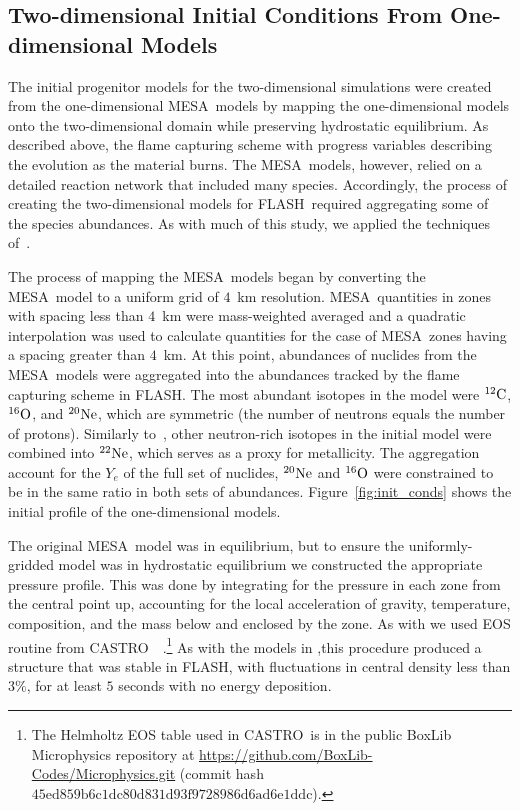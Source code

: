 \documentclass[iop,apj]{emulateapj}
\newcommand{\figref}[1]{Figure~\ref{#1}}
\newcommand{\C}[1]{\ensuremath{{}^{#1}{\rm C}}}
\newcommand{\Ox}[1]{\ensuremath{{}^{#1}{\rm O}}}
\newcommand{\Ne}[1]{\ensuremath{{}^{#1}{\rm Ne}}}
\newcommand{\code}[1]{\textsc{#1}}
\newcommand{\FLASH}{\code{FLASH}}
\newcommand{\CASTRO}{\code{CASTRO}}
\newcommand{\MESA}{\code{MESA}}
\begin{document}
\subsection{Two-dimensional Initial Conditions From One-dimensional Models}

The initial progenitor models for the two-dimensional simulations were
created from the one-dimensional \MESA\ models by mapping the one-dimensional
models onto the two-dimensional domain while 
preserving hydrostatic equilibrium.
As described above, the flame capturing scheme with progress
variables describing the evolution as the material burns. The \MESA\
models, however, relied on a detailed reaction network that included
many species. Accordingly, the process of creating the two-dimensional
models for \FLASH\ required aggregating some of the species abundances.
As with much of this study, we applied the 
techniques of~\citet{willcoxetal2016}.


The process of mapping the \MESA\ models began by converting 
the \MESA\ model to a uniform grid of $4$~km resolution. \MESA\ 
quantities in zones with spacing less than $4$~km 
were mass-weighted averaged and a quadratic interpolation
was used to calculate quantities for the case of \MESA\ zones having
a spacing greater than $4$~km. At this point, 
abundances of nuclides from the \MESA\ models were aggregated
into the abundances tracked by the flame capturing scheme in
\FLASH.
The most abundant isotopes in the model were \C{12}, \Ox{16},
and \Ne{20}, which are symmetric (the number of neutrons 
equals the number of protons). Similarly to~\citet{willcoxetal2016}, 
other neutron-rich isotopes in the initial model were combined into 
\Ne{22}, which serves as a proxy for metallicity. The aggregation
account for the $Y_e$ of the full set of nuclides, \Ne{20} 
and \Ox{16} were constrained to be in the same ratio in both 
sets of abundances. \figref{fig:init_conds} shows the initial
profile of the one-dimensional models.

The original \MESA\ model was in equilibrium, but to ensure
the uniformly-gridded model was in hydrostatic equilibrium we 
constructed the appropriate pressure profile. This was done by
integrating for the pressure in each zone from the central point up, 
accounting for the local acceleration of gravity, temperature,
composition, and the mass below and enclosed by the zone. As
with \citet{willcoxetal2016} we used
EOS routine from 
\CASTRO\ ~\citep{timmes.swesty:accuracy,castro1}.\footnote{The 
Helmholtz EOS table used in \CASTRO\ is in the public BoxLib 
Microphysics repository at
  \url{https://github.com/BoxLib-Codes/Microphysics.git} (commit 
  hash $\mathrm{45ed859b6c1dc80d831d93f9728986d6ad6e1ddc}$).} As 
 with the models in \citet{willcoxetal2016},this procedure produced 
 a structure that was stable in \FLASH, with fluctuations in central
density less than $3\%$, for at least $5$ seconds with no energy
deposition.
\end{document}

